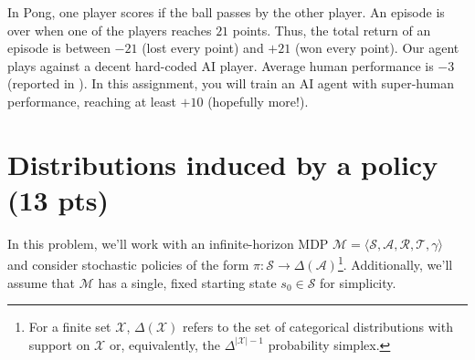 \documentclass{article}
\begin{document}
In Pong, one player scores if the ball passes by the other player. An episode is over when one of the players reaches $21$ points. Thus, the total return of an episode is between $-21$ (lost every point) and $+21$ (won every point). Our agent plays against a decent hard-coded AI player. Average human performance is $-3$ (reported in \cite{mnih-atari-2013}). In this assignment, you will train an AI agent with super-human performance, reaching at least $+10$ (hopefully more!).


\newpage

\section{Distributions induced by a policy (13 pts)}
In this problem, we'll work with an infinite-horizon MDP $\mathcal{M} = \langle \mathcal{S}, \mathcal{A}, \mathcal{R}, \mathcal{T}, \gamma \rangle$ and consider stochastic policies of the form $\pi: \mathcal{S} \rightarrow \Delta(\mathcal{A})$\footnote{For a finite set $\mathcal{X}$, $\Delta(\mathcal{X})$ refers to the set of categorical distributions with support on $\mathcal{X}$ or, equivalently, the $\Delta^{|\mathcal{X}|-1}$ probability simplex.}. Additionally, we'll assume that $\mathcal{M}$ has a single, fixed starting state $s_0 \in \mathcal{S}$ for simplicity.
\end{document}
